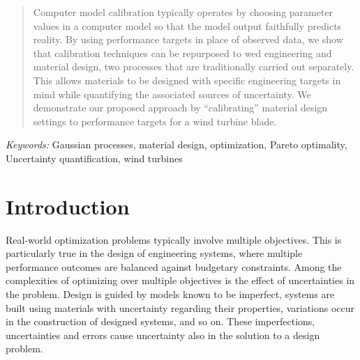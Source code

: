 \documentclass[12pt]{article}
\begin{document}
\bigskip
\begin{abstract}
%
%
Computer model calibration typically operates by choosing parameter values in a computer model so that the model output faithfully predicts reality.
%
By using performance targets in place of observed data, we show that calibration techniques can be repurposed to wed engineering and material design, two processes that are traditionally carried out separately.
%
This allows materials to be designed with specific engineering targets in mind while quantifying the associated sources of uncertainty.
%
We demonstrate our proposed approach by ``calibrating'' material design settings to performance targets for a wind turbine blade. %
\end{abstract}

\noindent%
{\it Keywords:}  Gaussian processes, material design, optimization, Pareto optimality, Uncertainty quantification, wind turbines
\vfill

\newpage
{} %
\section{Introduction}
\label{introduction}

Real-world optimization problems typically involve multiple objectives.
%
This is particularly true in the design of engineering systems, where multiple performance outcomes are balanced against budgetary constraints.
%
Among the complexities of optimizing over multiple objectives is the effect of uncertainties in the problem.
%
Design is guided by models known to be imperfect, systems are built using materials with uncertainty regarding their properties, variations occur in the construction of designed systems, and so on.
%
These imperfections, uncertainties and errors cause uncertainty also in the solution to a design problem.
%
\end{document}
